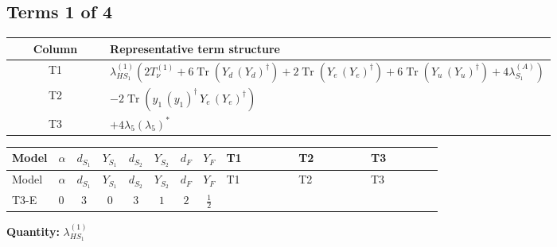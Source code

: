 \documentclass[8pt]{article}
\begin{document}
\begin{landscape}
\subsection*{Terms 1 of 4}
\begin{center}
\begin{tabular}{@{}c >{\raggedright\arraybackslash}p{0.82\linewidth}@{}}
\toprule
Column & Representative term structure \\
\midrule
T1 & \(\displaystyle {\lambda_{HS_1}^{(1)}} (2 T_{\nu}^{(1)}+6 \operatorname{Tr}\!\left({Y_d}\,\left({Y_d}\right)^{\dagger}\right)+2 \operatorname{Tr}\!\left({Y_e}\,\left({Y_e}\right)^{\dagger}\right)+6 \operatorname{Tr}\!\left({Y_u}\,\left({Y_u}\right)^{\dagger}\right)+4 {\lambda_{S_1}^{(A)}})\) \\
\midrule
T2 & \(\displaystyle -2 \operatorname{Tr}\!\left({y_1}\,\left({y_1}\right)^{\dagger}\,{Y_e}\,\left({Y_e}\right)^{\dagger}\right)\) \\
\midrule
T3 & \(\displaystyle +4 {\lambda_5} \left({\lambda_5}\right)^{*}\) \\
\midrule
\bottomrule
\end{tabular}
\end{center}
\smallskip
\tiny
\begin{longtable}{@{}llcccccc >{\raggedright\arraybackslash}p{0.21\linewidth} >{\raggedright\arraybackslash}p{0.21\linewidth} >{\raggedright\arraybackslash}p{0.21\linewidth}@{}}
\toprule
Model & $\alpha$ & $d_{S_1}$ & $Y_{S_1}$ & $d_{S_2}$ & $Y_{S_2}$ & $d_F$ & $Y_F$ & T1 & T2 & T3 \\
\midrule
\endfirsthead
\toprule
Model & $\alpha$ & $d_{S_1}$ & $Y_{S_1}$ & $d_{S_2}$ & $Y_{S_2}$ & $d_F$ & $Y_F$ & T1 & T2 & T3 \\
\midrule
\endhead
T3-E & $0$ & $3$ & $0$ & $3$ & $1$ & $2$ & $\frac{1}{2}$ & \scriptsize\adjustbox{max width=\linewidth}{$\begin{gathered} {\lambda_{HS_1}^{(1)}} (2 T_{\nu}^{(1)}+6 \operatorname{Tr}\!\left({Y_d}\,\left({Y_d}\right)^{\dagger}\right)+2 \operatorname{Tr}\!\left({Y_e}\,\left({Y_e}\right)^{\dagger}\right)+6 \operatorname{Tr}\!\left({Y_u}\,\left({Y_u}\right)^{\dagger}\right)+4 {\lambda_{S_1}^{(A)}})\end{gathered}$} & \scriptsize\adjustbox{max width=\linewidth}{$\begin{gathered} -2 \operatorname{Tr}\!\left({y_1}\,\left({y_1}\right)^{\dagger}\,{Y_e}\,\left({Y_e}\right)^{\dagger}\right)\end{gathered}$} & \scriptsize\adjustbox{max width=\linewidth}{$\begin{gathered} +4 {\lambda_5} \left({\lambda_5}\right)^{*}\end{gathered}$} \\
\midrule
\bottomrule
\end{longtable}
\clearpage
\noindent\textbf{Quantity: }$\lambda_{HS_1}^{(1)}$\par\smallskip

\end{landscape}
\end{document}
